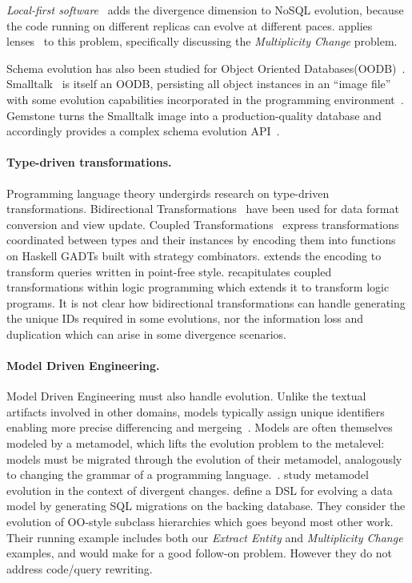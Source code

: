 \documentclass[english,submission]{programming}
\begin{document}
\emph{Local-first software}~\cite{localfirst} adds the divergence dimension to NoSQL evolution, because the code running on different replicas can evolve at different paces. \citet{Cambria} applies lenses~\cite{Foster2007} to this problem, specifically discussing the \emph{Multiplicity Change} problem.

Schema evolution has also been studied for Object Oriented Databases(OODB)~\cite{li99,banerjee87}. Smalltalk~\cite{Goldberg80} is itself an OODB, persisting all object instances in an ``image file'' with some evolution capabilities incorporated in the programming environment~\cite[pp.252-272]{Goldberg80}. Gemstone turns the Smalltalk image into a production-quality database and accordingly provides a complex schema evolution API~\cite{Gemstone}.

\paragraph{Type-driven transformations.}
Programming language theory undergirds research on type-driven transformations. Bidirectional Transformations~\cite{czarnecki2009bidirectional} have been used for data format conversion and view update.
Coupled Transformations~\cite{Berdaguer07, alcino06, Cleve2006} express transformations coordinated between types and their instances by encoding them into functions on Haskell GADTs built with strategy combinators. \citet{JVisser08} extends the encoding to transform queries written in point-free style. \citet{lammel16} recapitulates coupled transformations within logic programming which extends it to transform logic programs. It is not clear how bidirectional transformations can handle generating the unique IDs required in some evolutions, nor the information loss and duplication which can arise in some divergence scenarios.

\paragraph{Model Driven Engineering.}
Model Driven Engineering must also handle evolution. Unlike the textual artifacts involved in other domains, models typically assign unique identifiers enabling more precise differencing and mergeing~\cite{alanen2003}.
Models are often themselves modeled by a metamodel, which lifts the evolution problem to the metalevel: models must be migrated through the evolution of their metamodel, analogously to changing the grammar of a programming language.~\cite{Herrmannsdoerfer11}. \citet{Cicchetti11} study metamodel evolution in the context of divergent changes.
\citet{vermolen11} define a DSL for evolving a data model by generating SQL migrations on the backing database. They consider the evolution of OO-style subclass hierarchies which goes beyond most other work. Their running example includes both our \emph{Extract Entity} and \emph{Multiplicity Change} examples, and would make for a good follow-on problem. However they do not address code/query rewriting.
\end{document}

